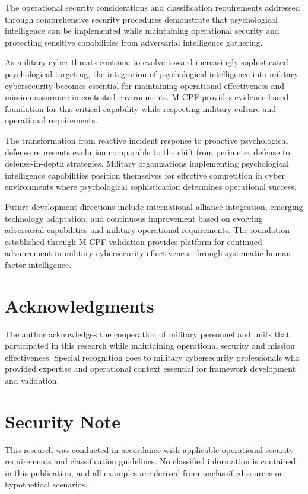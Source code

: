 \documentclass[10pt, twocolumn]{article}
\begin{document}
The operational security considerations and classification requirements addressed through comprehensive security procedures demonstrate that psychological intelligence can be implemented while maintaining operational security and protecting sensitive capabilities from adversarial intelligence gathering.

As military cyber threats continue to evolve toward increasingly sophisticated psychological targeting, the integration of psychological intelligence into military cybersecurity becomes essential for maintaining operational effectiveness and mission assurance in contested environments. M-CPF provides evidence-based foundation for this critical capability while respecting military culture and operational requirements.

The transformation from reactive incident response to proactive psychological defense represents evolution comparable to the shift from perimeter defense to defense-in-depth strategies. Military organizations implementing psychological intelligence capabilities position themselves for effective competition in cyber environments where psychological sophistication determines operational success.

Future development directions include international alliance integration, emerging technology adaptation, and continuous improvement based on evolving adversarial capabilities and military operational requirements. The foundation established through M-CPF validation provides platform for continued advancement in military cybersecurity effectiveness through systematic human factor intelligence.

\section*{Acknowledgments}

The author acknowledges the cooperation of military personnel and units that participated in this research while maintaining operational security and mission effectiveness. Special recognition goes to military cybersecurity professionals who provided expertise and operational context essential for framework development and validation.

\section*{Security Note}

This research was conducted in accordance with applicable operational security requirements and classification guidelines. No classified information is contained in this publication, and all examples are derived from unclassified sources or hypothetical scenarios.
\end{document}
